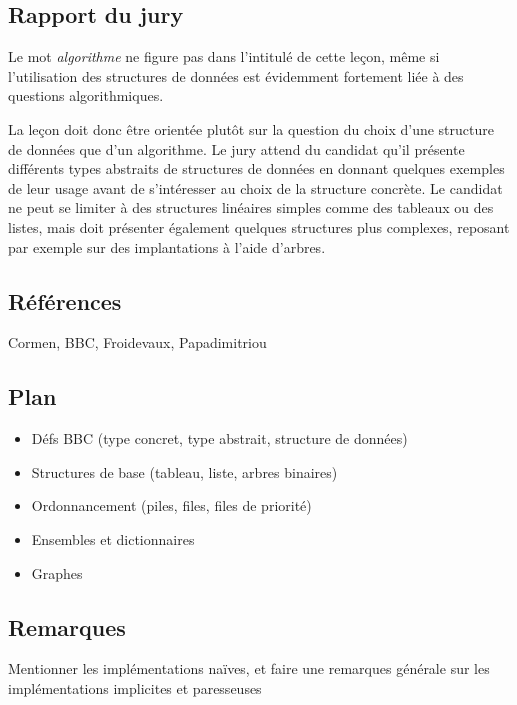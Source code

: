 \documentclass[../../agregation.tex]{subfiles}
\begin{document}

\subsection{Rapport du jury}

\begin{aquote}{}
Le mot \emph{algorithme} ne figure pas dans l'intitulé de cette leçon, même si l'utilisation des structures de données est évidemment fortement liée à des questions algorithmiques.

La leçon doit donc être orientée plutôt sur la question du choix d'une structure de données que d'un algorithme. Le jury attend du candidat qu'il présente différents types abstraits de structures de données en donnant quelques exemples de leur usage avant de s'intéresser au choix de la structure concrète. Le candidat ne peut se limiter à des structures linéaires simples comme des tableaux ou des listes, mais doit présenter également quelques structures plus complexes, reposant par exemple sur des implantations à l'aide d'arbres.
\end{aquote}

\dvts

\subsection{Références}

Cormen, BBC, Froidevaux, Papadimitriou

\subsection{Plan}

\begin{itemize}
	\item Défs BBC (type concret, type abstrait, structure de données)
	\item Structures de base (tableau, liste, arbres binaires)
	\item Ordonnancement (piles, files, files de priorité)
	\item Ensembles et dictionnaires
	\item Graphes
\end{itemize}

\subsection{Remarques}

Mentionner les implémentations naïves, et faire une remarques générale sur les implémentations implicites et paresseuses
\end{document}
